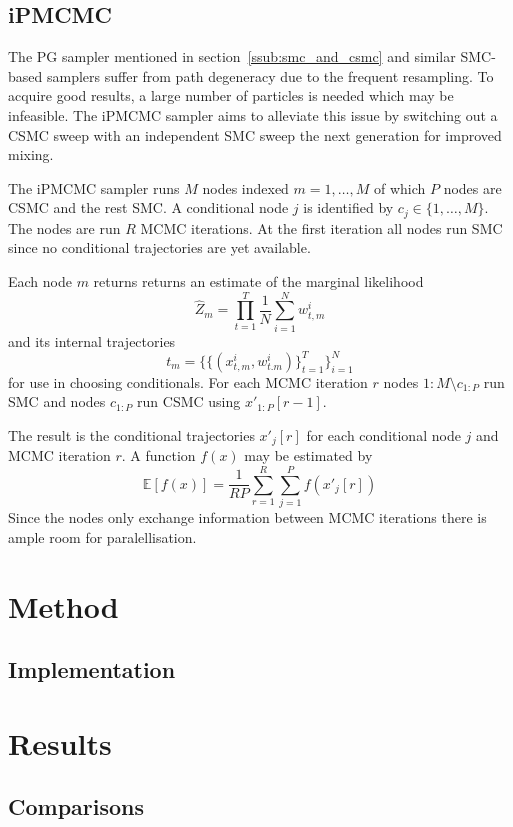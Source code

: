 \subsection{iPMCMC}

The PG sampler mentioned in section~\ref{ssub:smc_and_csmc} and similar SMC-based samplers suffer from path degeneracy due to the frequent resampling. To acquire good results, a large number of particles is needed which may be infeasible. The iPMCMC sampler aims to alleviate this issue by switching out a CSMC sweep with an independent SMC sweep the next generation for improved mixing.

The iPMCMC sampler runs $M$ nodes indexed $m = 1,\dots,M$ of which $P$ nodes are CSMC and the rest SMC. A conditional node $j$ is identified by $c_j \in \{1,\dots,M\}$. The nodes are run $R$ MCMC iterations. At the first iteration all nodes run SMC since no conditional trajectories are yet available.

Each node $m$ returns returns an estimate of the marginal likelihood
\begin{equation}
    \hat Z_m = \prod\limits_{t=1}^T \frac 1 N \sum\limits_{i=1}^N w_{t,m}^i
\end{equation} and its internal trajectories
\begin{equation}
t_m = \{\{(x^i_{t,m},w^i_{t.m})\}_{t=1}^T\}_{i=1}^N
\end{equation}
for use in choosing conditionals. For each MCMC iteration $r$ nodes $1:M \setminus c_{1:P}$ run SMC and nodes $c_{1:P}$ run CSMC using $x'_{1:P}[r-1]$. 

The result is the conditional trajectories $x'_j[r]$ for each conditional node $j$ and MCMC iteration $r$. A function $f(x)$ may be estimated by
\begin{equation}
    \mathbb{E}[f(x)] = \frac 1 {RP} \sum\limits_{r=1}^R \sum\limits_{j=1}^P f(x'_j[r])
\end{equation}
Since the nodes only exchange information between MCMC iterations there is ample room for paralellisation.

\section{Method}
\subsection{Implementation}

\section{Results}
\subsection{Comparisons}
